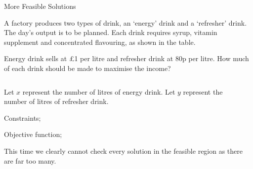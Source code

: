\documentclass[8pt]{beamer}
\begin{document}
\begin{frame}{More Feasible Solutions}
	\begin{problem}
		A factory produces two types of drink, an ‘energy’ drink and a ‘refresher’ drink. The day’s
output is to be planned. Each drink requires syrup, vitamin supplement and concentrated
flavouring, as shown in the table.

Energy drink sells at £1 per litre and refresher drink at 80p per litre. How much of each drink
should be made to maximise the income?

	\end{problem}
\begin{columns}
\begin{column}{.6\linewidth}
Let $x$ represent the number of litres of energy drink.
Let $y$ represent the number of litres of refresher drink.

Constraints;

Objective function;

\alert{This time we clearly cannot check every solution in the feasible region as there are far too many.}
\end{column}
\begin{column}{.4\linewidth}

				\centering
\end{column}
\end{columns}
\end{frame}
\end{document}

